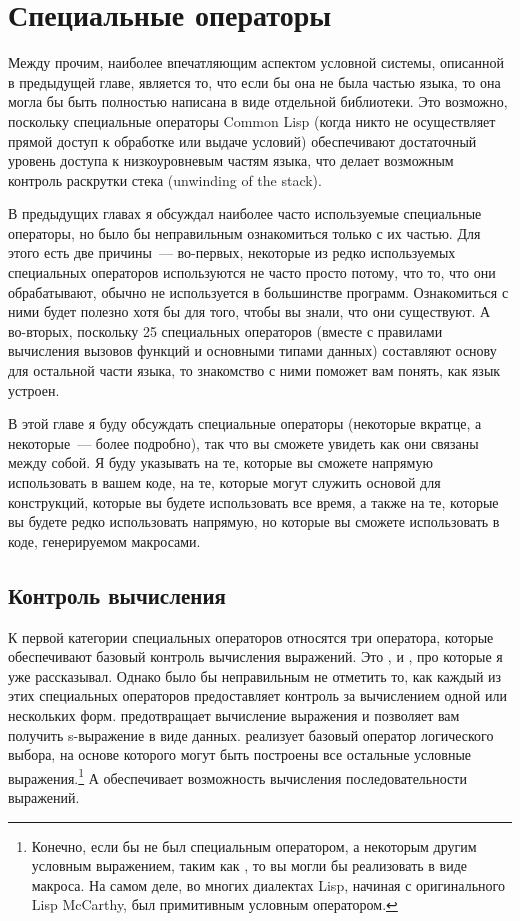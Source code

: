 \chapter{Специальные операторы}
\label{ch:20}

Между прочим, наиболее впечатляющим аспектом условной системы, описанной в предыдущей
главе, является то, что если бы она не была частью языка, то она могла бы быть полностью
написана в виде отдельной библиотеки.  Это возможно, поскольку специальные операторы
Common Lisp (когда никто не осуществляет прямой доступ к обработке или выдаче условий)
обеспечивают достаточный уровень доступа к низкоуровневым частям языка, что делает
возможным контроль раскрутки стека (unwinding of the stack).

В предыдущих главах я обсуждал наиболее часто используемые специальные операторы, но было
бы неправильным ознакомиться только с их частью.  Для этого есть две причины~--- во-первых,
некоторые из редко используемых специальных операторов используются не часто просто
потому, что то, что они обрабатывают, обычно не используется в большинстве программ.
Ознакомиться с ними будет полезно хотя бы для того, чтобы вы знали, что они существуют.  А
во-вторых, поскольку 25 специальных операторов (вместе с правилами вычисления вызовов
функций и основными типами данных) составляют основу для остальной части языка, то
знакомство с ними поможет вам понять, как язык устроен.

В этой главе я буду обсуждать специальные операторы (некоторые вкратце, а некоторые~---
более подробно), так что вы сможете увидеть как они связаны между собой.  Я буду указывать
на те, которые вы сможете напрямую использовать в вашем коде, на те, которые могут служить
основой для конструкций, которые вы будете использовать все время, а также на те, которые
вы будете редко использовать напрямую, но которые вы сможете использовать в коде,
генерируемом макросами.

\section{Контроль вычисления}

К первой категории специальных операторов относятся три оператора, которые обеспечивают
базовый контроль вычисления выражений. Это ,  и , про
которые я уже рассказывал.  Однако было бы неправильным не отметить то, как каждый из этих
специальных операторов предоставляет контроль за вычислением одной или нескольких форм.
 предотвращает вычисление выражения и позволяет вам получить s-выражение в
виде данных.  реализует базовый оператор логического выбора, на основе которого
могут быть построены все остальные условные выражения.\footnote{Конечно, если бы 
  не был специальным оператором, а некоторым другим условным выражением, таким как
  , то вы могли бы реализовать  в виде макроса.  На самом деле, во
  многих диалектах Lisp, начиная с оригинального Lisp McCarthy,  был
  примитивным условным оператором.}  А  обеспечивает возможность вычисления
последовательности выражений.

